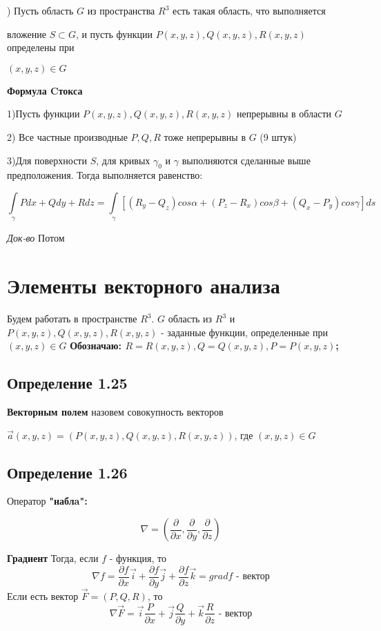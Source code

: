 \documentclass[12pt, english]{article}
\begin{document}
) Пусть область $G$ из пространства $R^3$ есть такая область, что
выполняется\par  вложение $S \subset G$, и пусть функции $P(x, y, z), Q(x, y, z),
R(x, y, z)$ определены при \par $(x, y, z) \in G$

\textbf{Формула Cтокса}

1)Пусть функции $P(x, y, z), Q(x, y, z), R(x, y, z)$ непрерывны в области $G$ 

2) Все частные производные $P , Q , R$ тоже непрерывны в $G$ (9 штук)

3)Для поверхности $S$, для кривых $\gamma_0$ и $\gamma$ выполняются сделанные выше
предположения. Тогда выполняется равенство: 

\begin{equation}\label{eq11}
\int\limits_{\gamma} Pdx + Qdy + Rdz
=
\int\limits_{\gamma} [(R_y - Q_z)cos\alpha + (P_z - R_x)cos\beta	+ (Q_x - P_y)cos\gamma]ds
\end{equation}

\textit{Док-во}
Потом



\newpage
\section{Элементы векторного анализа}
	Будем работать в пространстве $R^3$. $G$ область из $R^3$ и $P(x,y,z), Q(x,y,z), R(x,y,z)$ - заданные функции, определенные при 
	$(x,y,z) \in G$
	\textbf{Обозначаю: $R = R(x, y ,z) , Q = Q(x,y,z) , P = P(x,y,z)$;}
	
\subsection*{Определение 1.25}
	\textbf{Векторным полем} назовем совокупность векторов 
	
	$\vec{a}(x,y,z) = (P(x,y,z) , Q(x,y,z), R(x,y,z))$, где $(x,y,z) \in G$
	
\subsection*{Определение 1.26}
Оператор \textbf{"наблa":}
	
	

	$$\nabla = ( \frac{\partial}{\partial x} ,  \frac{\partial}{\partial y} , \frac{\partial}{\partial z})$$
	
\textbf{Градиент}
	Тогда, если $f$ - функция, то  
	$$\nabla f =   \frac{\partial f}{\partial x} \vec{i} +  \frac{\partial f}{\partial y}\vec{j} + \frac{\partial f}{\partial z} \vec{k}= grad f \text{ - вектор}$$ 
 	Если есть вектор $\vec{F} = (P, Q, R)$, то
 		$$\nabla \vec{F} = \vec{i}  \frac{P}{\partial x} + \vec{j} \frac{Q}{\partial y} + \vec{k}\frac{R}{\partial z} \text{ - вектор}$$ 
	
\end{document}
